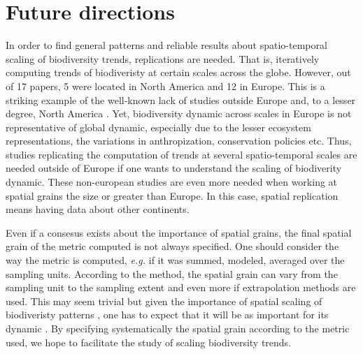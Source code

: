 \documentclass[
  12pt,
  oneside]{report}
\begin{document}
\hypertarget{future-directions}{%
\chapter{Future directions}\label{future-directions}}

In order to find general patterns and reliable results about spatio-temporal scaling of biodiversity trends, replications are needed. That is, iteratively computing trends of biodiveristy at certain scales across the globe. However, out of 17 papers, 5 were located in North America and 12 in Europe. This is a striking example of the well-known lack of studies outside Europe and, to a lesser degree, North America \autocite{fraixedas_state_2020}. Yet, biodiversity dynamic across scales in Europe is not representative of global dynamic, especially due to the lesser ecosystem representations, the variations in anthropization, conservation policies etc. Thus, studies replicating the computation of trends at several spatio-temporal scales are needed outside of Europe if one wants to understand the scaling of biodiverity dynamic. These non-european studies are even more needed when working at spatial grains the size or greater than Europe. In this case, spatial replication means having data about other continents.

Even if a consesus exists about the importance of spatial grains, the final spatial grain of the metric computed is not always specified. One should consider the way the metric is computed, \emph{e.g.} if it was summed, modeled, averaged over the sampling units. According to the method, the spatial grain can vary from the sampling unit to the sampling extent and even more if extrapolation methods are used. This may seem trivial but given the importance of spatial scaling of biodiveristy patterns \autocite{storch_untangling_2004}, one has to expect that it will be as important for its dynamic \autocite{chase_species_2019}. By specifying systematically the spatial grain according to the metric used, we hope to facilitate the study of scaling biodiversity trends.
\end{document}
